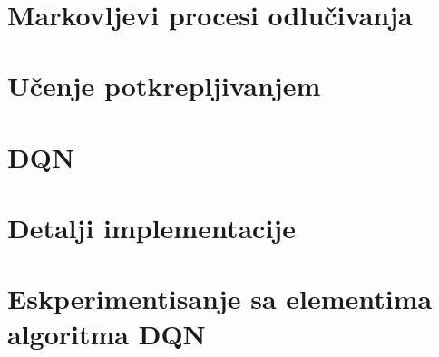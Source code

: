 \documentclass[12pt]{report}
\begin{document}
\newpage ~ \thispagestyle{empty}

\tableofcontents{}

\newpage
{}




\chapter{Markovljevi procesi odlučivanja}
\label{ch:mdp}

\chapter{Učenje potkrepljivanjem}
\label{ch:rl}

\chapter{DQN}
\label{ch:dqn}

\chapter{Detalji implementacije}
\label{ch:implementacija}

\chapter{Eskperimentisanje sa elementima algoritma DQN}
\label{ch:eksperimenti}
\end{document}
